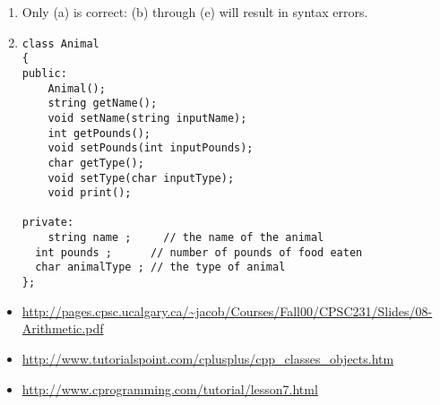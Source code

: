 \begin{enumerate}
	\item Only (a) is correct: (b) through (e) will result in syntax errors.
	\item 
	
\noindent\begin{minipage}{\linewidth}\begin{lstlisting}
class Animal
{
public:
	Animal();
	string getName();
	void setName(string inputName);
	int getPounds();
	void setPounds(int inputPounds);
	char getType();
	void setType(char inputType);
	void print();

private:
	string name ;     // the name of the animal
  int pounds ;      // number of pounds of food eaten
  char animalType ; // the type of animal
};
\end{lstlisting}\end{minipage}

	
\end{enumerate}


\begin{itemize}
\item \url{http://pages.cpsc.ucalgary.ca/~jacob/Courses/Fall00/CPSC231/Slides/08-Arithmetic.pdf}
\item \url{http://www.tutorialspoint.com/cplusplus/cpp_classes_objects.htm}
\item \url{http://www.cprogramming.com/tutorial/lesson7.html}
\end{itemize}	
